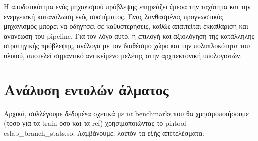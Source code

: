 \documentclass{article}
\begin{document}
Η αποδοτικότητα ενός μηχανισμού πρόβλεψης επηρεάζει άμεσα την ταχύτητα και την ενεργειακή κατανάλωση ενός συστήματος. Ένας λανθασμένος προγνωστικός μηχανισμός μπορεί να οδηγήσει σε καθυστερήσεις, καθώς απαιτείται εκκαθάριση και ανανέωση του pipeline. Για τον λόγο αυτό, η επιλογή και αξιολόγηση της κατάλληλης στρατηγικής πρόβλεψης, ανάλογα με τον διαθέσιμο χώρο και την πολυπλοκότητα του υλικού, αποτελεί σημαντικό αντικείμενο μελέτης στην αρχιτεκτονική υπολογιστών.

\section{Ανάλυση εντολών άλματος}
Αρχικά, συλλέγουμε δεδομένα σχετικά με τα benchmarks που θα χρησιμοποιήσουμε (τόσο για τα train όσο και τα ref) χρησιμοποιώντας το pintool cslab\_branch\_stats.so. Λαμβάνουμε, λοιπόν τα εξής αποτελέσματα:
\end{document}
